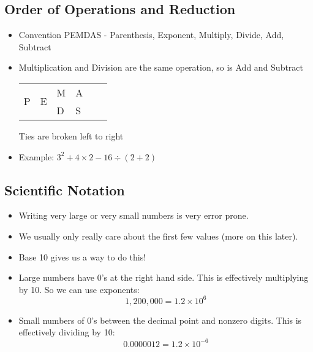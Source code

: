 \documentclass{article}
\begin{document}
\subsection{Order of Operations and Reduction}
\begin{itemize}
    \item Convention PEMDAS - Parenthesis, Exponent, Multiply, Divide, Add, Subtract
    \item Multiplication and Division are the same operation, so is Add and Subtract \newline
    \begin{tabular}{llllll}
        \multirow{2}{*}{P} & \multirow{2}{*}{E} & M & A\\
        & & D & S\\
    \end{tabular}\newline
    Ties are broken left to right
    \item Example: $3^2+4\times2-16\div(2+2)$
\end{itemize}

\subsection{Scientific Notation}
\begin{itemize}
    \item Writing very large or very small numbers is very error prone.
    \item We usually only really care about the first few values (more on this later).
    \item Base 10 gives us a way to do this!
    \item Large numbers have 0's at the right hand side.  This is effectively multiplying
    by 10.  So we can use exponents:
    \[
    1,200,000 = 1.2 \times 10^6
    \] 
   \item Small numbers of 0's between the decimal point and nonzero digits.  This is effectively dividing by 10:
   \[
   0.0000012 = 1.2 \times 10^{-6}
   \]
\end{itemize}
\end{document}
